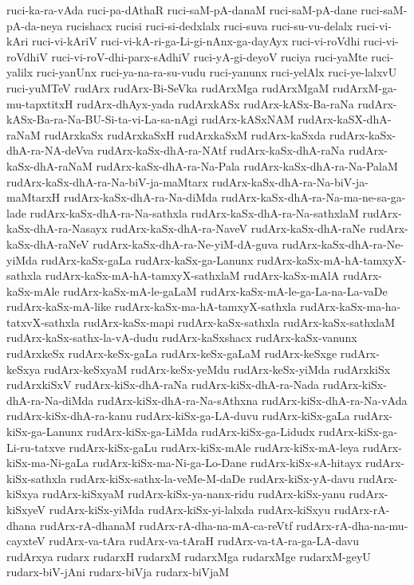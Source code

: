 {ruci-ka-ra-vAda
ruci-pa-dAthaR
ruci-saM-pA-danaM
ruci-saM-pA-dane
ruci-saM-pA-da-neya
rucishacx
rucisi
ruci-si-dedxlalx
ruci-suva
ruci-su-vu-delalx
ruci-vi-kAri
ruci-vi-kAriV
ruci-vi-kA-ri-ga-Li-gi-nAnx-ga-dayAyx
ruci-vi-roVdhi
ruci-vi-roVdhiV
ruci-vi-roV-dhi-parx-sAdhiV
ruci-yA-gi-deyoV
ruciya
ruci-yaMte
ruci-yalilx
ruci-yanUnx
ruci-ya-na-ra-su-vudu
ruci-yanunx
ruci-yelAlx
ruci-ye-lalxvU
ruci-yuMTeV
rudArx
rudArx-Bi-SeVka
rudArxMga
rudArxMgaM
rudArxM-ga-mu-tapxtitxH
rudArx-dhAyx-yada
rudArxkASx
rudArx-kASx-Ba-raNa
rudArx-kASx-Ba-ra-Na-BU-Si-ta-vi-La-sa-nAgi
rudArx-kASxNAM
rudArx-kaSX-dhA-raNaM
rudArxkaSx
rudArxkaSxH
rudArxkaSxM
rudArx-kaSxda
rudArx-kaSx-dhA-ra-NA-deVva
rudArx-kaSx-dhA-ra-NAtf
rudArx-kaSx-dhA-raNa
rudArx-kaSx-dhA-raNaM
rudArx-kaSx-dhA-ra-Na-Pala
rudArx-kaSx-dhA-ra-Na-PalaM
rudArx-kaSx-dhA-ra-Na-biV-ja-maMtarx
rudArx-kaSx-dhA-ra-Na-biV-ja-maMtarxH
rudArx-kaSx-dhA-ra-Na-diMda
rudArx-kaSx-dhA-ra-Na-ma-ne-sa-ga-lade
rudArx-kaSx-dhA-ra-Na-sathxla
rudArx-kaSx-dhA-ra-Na-sathxlaM
rudArx-kaSx-dhA-ra-Nasayx
rudArx-kaSx-dhA-ra-NaveV
rudArx-kaSx-dhA-raNe
rudArx-kaSx-dhA-raNeV
rudArx-kaSx-dhA-ra-Ne-yiM-dA-guva
rudArx-kaSx-dhA-ra-Ne-yiMda
rudArx-kaSx-gaLa
rudArx-kaSx-ga-Lanunx
rudArx-kaSx-mA-hA-tamxyX-sathxla
rudArx-kaSx-mA-hA-tamxyX-sathxlaM
rudArx-kaSx-mAlA
rudArx-kaSx-mAle
rudArx-kaSx-mA-le-gaLaM
rudArx-kaSx-mA-le-ga-La-na-La-vaDe
rudArx-kaSx-mA-like
rudArx-kaSx-ma-hA-tamxyX-sathxla
rudArx-kaSx-ma-ha-tatxvX-sathxla
rudArx-kaSx-mapi
rudArx-kaSx-sathxla
rudArx-kaSx-sathxlaM
rudArx-kaSx-sathx-la-vA-dudu
rudArx-kaSxshacx
rudArx-kaSx-vanunx
rudArxkeSx
rudArx-keSx-gaLa
rudArx-keSx-gaLaM
rudArx-keSxge
rudArx-keSxya
rudArx-keSxyaM
rudArx-keSx-yeMdu
rudArx-keSx-yiMda
rudArxkiSx
rudArxkiSxV
rudArx-kiSx-dhA-raNa
rudArx-kiSx-dhA-ra-Nada
rudArx-kiSx-dhA-ra-Na-diMda
rudArx-kiSx-dhA-ra-Na-sAthxna
rudArx-kiSx-dhA-ra-Na-vAda
rudArx-kiSx-dhA-ra-kanu
rudArx-kiSx-ga-LA-duvu
rudArx-kiSx-gaLa
rudArx-kiSx-ga-Lanunx
rudArx-kiSx-ga-LiMda
rudArx-kiSx-ga-Lidudx
rudArx-kiSx-ga-Li-ru-tatxve
rudArx-kiSx-gaLu
rudArx-kiSx-mAle
rudArx-kiSx-mA-leya
rudArx-kiSx-ma-Ni-gaLa
rudArx-kiSx-ma-Ni-ga-Lo-Dane
rudArx-kiSx-sA-hitayx
rudArx-kiSx-sathxla
rudArx-kiSx-sathx-la-veMe-M-daDe
rudArx-kiSx-yA-davu
rudArx-kiSxya
rudArx-kiSxyaM
rudArx-kiSx-ya-nanx-ridu
rudArx-kiSx-yanu
rudArx-kiSxyeV
rudArx-kiSx-yiMda
rudArx-kiSx-yi-lalxda
rudArx-kiSxyu
rudArx-rA-dhana
rudArx-rA-dhanaM
rudArx-rA-dha-na-mA-ca-reVtf
rudArx-rA-dha-na-mu-cayxteV
rudArx-va-tAra
rudArx-va-tAraH
rudArx-va-tA-ra-ga-LA-davu
rudArxya
rudarx
rudarxH
rudarxM
rudarxMga
rudarxMge
rudarxM-geyU
rudarx-biV-jAni
rudarx-biVja
rudarx-biVjaM
}
